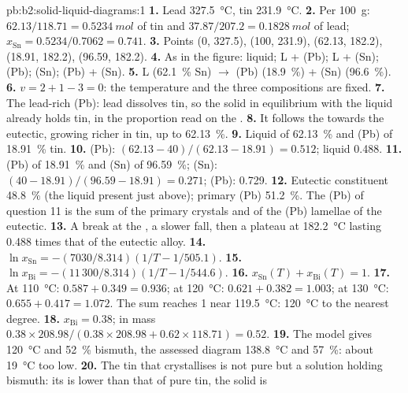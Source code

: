 \begin{solution}{pb:b2:solid-liquid-diagrams:1}
\textbf{1.} Lead \qty{327.5}{\degreeCelsius}, tin \qty{231.9}{\degreeCelsius}.
\textbf{2.} Per \qty{100}{g}: $62.13/118.71 = \qty{0.5234}{mol}$ of tin and
$37.87/207.2 = \qty{0.1828}{mol}$ of lead; $x_{\mathrm{Sn}} = 0.5234/0.7062 =
0.741$.
\textbf{3.} Points (0, 327.5), (100, 231.9), (62.13, 182.2), (18.91, 182.2),
(96.59, 182.2).
\textbf{4.} As in the figure: liquid; L + (Pb); L + (Sn); (Pb); (Sn); (Pb) + (Sn).
\textbf{5.} L (62.1~\% Sn) $\longrightarrow$ (Pb) (18.9~\%) + (Sn) (96.6~\%).
\textbf{6.} $v = 2 + 1 - 3 = 0$: the temperature and the three compositions are
fixed.
\textbf{7.} The lead-rich  (Pb): lead dissolves tin, so the solid in
equilibrium with the liquid already holds tin, in the proportion read on the
.
\textbf{8.} It follows the  towards the eutectic, growing richer in tin,
up to 62.13~\%.
\textbf{9.} Liquid of 62.13~\% and (Pb) of 18.91~\% tin.
\textbf{10.} (Pb): $(62.13 - 40)/(62.13 - 18.91) = 0.512$; liquid 0.488.
\textbf{11.} (Pb) of 18.91~\% and (Sn) of 96.59~\%; (Sn): $(40 - 18.91)/(96.59 -
18.91) = 0.271$; (Pb): 0.729.
\textbf{12.} Eutectic constituent 48.8~\% (the liquid present just above);
primary (Pb) 51.2~\%. The (Pb) of question 11 is the sum of the primary
crystals and of the (Pb) lamellae of the eutectic.
\textbf{13.} A break at the , a slower fall, then a plateau at
\qty{182.2}{\degreeCelsius} lasting 0.488 times that of the eutectic alloy.
\textbf{14.} $\ln x_{\mathrm{Sn}} = -(7030/8.314)(1/T - 1/505.1)$.
\textbf{15.} $\ln x_{\mathrm{Bi}} = -(11\,300/8.314)(1/T - 1/544.6)$.
\textbf{16.} $x_{\mathrm{Sn}}(T) + x_{\mathrm{Bi}}(T) = 1$.
\textbf{17.} At \qty{110}{\degreeCelsius}: $0.587 + 0.349 = 0.936$; at
\qty{120}{\degreeCelsius}: $0.621 + 0.382 = 1.003$; at
\qty{130}{\degreeCelsius}: $0.655 + 0.417 = 1.072$. The sum reaches 1 near
\qty{119.5}{\degreeCelsius}: \qty{120}{\degreeCelsius} to the nearest degree.
\textbf{18.} $x_{\mathrm{Bi}} = 0.38$; in mass $0.38 \times 208.98/(0.38 \times
208.98 + 0.62 \times 118.71) = 0.52$.
\textbf{19.} The model gives \qty{120}{\degreeCelsius} and 52~\% bismuth, the
assessed diagram \qty{138.8}{\degreeCelsius} and 57~\%: about
\qty{19}{\degreeCelsius} too low.
\textbf{20.} The tin that crystallises is not pure but a solution holding
bismuth: its  is lower than that of pure tin, the solid is

\end{solution}
